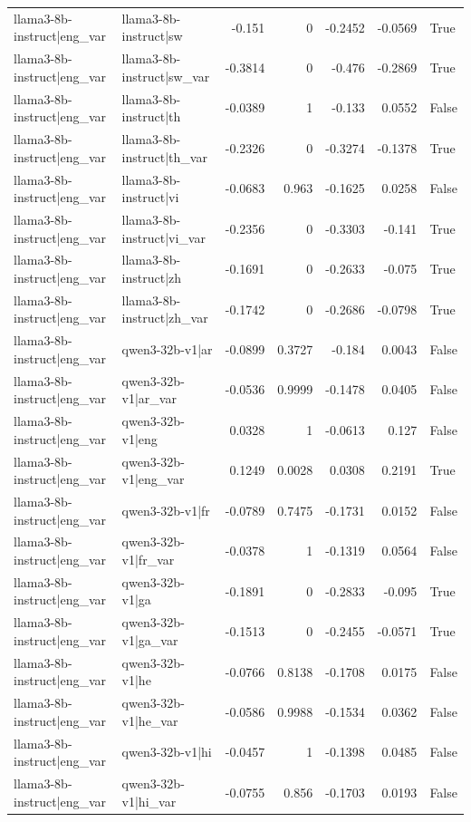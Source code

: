 \begin{table}
\begin{tabular}{l l r r r r l}
llama3-8b-instruct|eng_var & llama3-8b-instruct|sw & -0.151 & 0 & -0.2452 & -0.0569 & True \\
llama3-8b-instruct|eng_var & llama3-8b-instruct|sw_var & -0.3814 & 0 & -0.476 & -0.2869 & True \\
llama3-8b-instruct|eng_var & llama3-8b-instruct|th & -0.0389 & 1 & -0.133 & 0.0552 & False \\
llama3-8b-instruct|eng_var & llama3-8b-instruct|th_var & -0.2326 & 0 & -0.3274 & -0.1378 & True \\
llama3-8b-instruct|eng_var & llama3-8b-instruct|vi & -0.0683 & 0.963 & -0.1625 & 0.0258 & False \\
llama3-8b-instruct|eng_var & llama3-8b-instruct|vi_var & -0.2356 & 0 & -0.3303 & -0.141 & True \\
llama3-8b-instruct|eng_var & llama3-8b-instruct|zh & -0.1691 & 0 & -0.2633 & -0.075 & True \\
llama3-8b-instruct|eng_var & llama3-8b-instruct|zh_var & -0.1742 & 0 & -0.2686 & -0.0798 & True \\
llama3-8b-instruct|eng_var & qwen3-32b-v1|ar & -0.0899 & 0.3727 & -0.184 & 0.0043 & False \\
llama3-8b-instruct|eng_var & qwen3-32b-v1|ar_var & -0.0536 & 0.9999 & -0.1478 & 0.0405 & False \\
llama3-8b-instruct|eng_var & qwen3-32b-v1|eng & 0.0328 & 1 & -0.0613 & 0.127 & False \\
llama3-8b-instruct|eng_var & qwen3-32b-v1|eng_var & 0.1249 & 0.0028 & 0.0308 & 0.2191 & True \\
llama3-8b-instruct|eng_var & qwen3-32b-v1|fr & -0.0789 & 0.7475 & -0.1731 & 0.0152 & False \\
llama3-8b-instruct|eng_var & qwen3-32b-v1|fr_var & -0.0378 & 1 & -0.1319 & 0.0564 & False \\
llama3-8b-instruct|eng_var & qwen3-32b-v1|ga & -0.1891 & 0 & -0.2833 & -0.095 & True \\
llama3-8b-instruct|eng_var & qwen3-32b-v1|ga_var & -0.1513 & 0 & -0.2455 & -0.0571 & True \\
llama3-8b-instruct|eng_var & qwen3-32b-v1|he & -0.0766 & 0.8138 & -0.1708 & 0.0175 & False \\
llama3-8b-instruct|eng_var & qwen3-32b-v1|he_var & -0.0586 & 0.9988 & -0.1534 & 0.0362 & False \\
llama3-8b-instruct|eng_var & qwen3-32b-v1|hi & -0.0457 & 1 & -0.1398 & 0.0485 & False \\
llama3-8b-instruct|eng_var & qwen3-32b-v1|hi_var & -0.0755 & 0.856 & -0.1703 & 0.0193 & False \\

\end{tabular}
\end{table}
